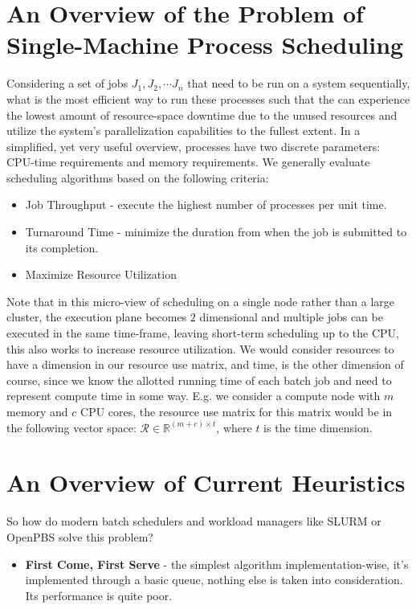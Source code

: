 \documentclass{article}
\begin{document}
\begin{spacing}{2.0}
\newpage
\section{An Overview of the Problem of Single-Machine Process Scheduling}

Considering a set of jobs $J_{1}, J_{2}, \cdots J_{n}$ that need to be run on a system sequentially, what is the most efficient way to run these processes such that the can experience the lowest amount of resource-space downtime due to the unused resources and utilize the system's parallelization capabilities to the fullest extent. In a simplified, yet very useful overview, processes have two discrete parameters: CPU-time requirements and memory requirements. We generally evaluate scheduling algorithms based on the following criteria:

\begin{itemize}
    \item Job Throughput - execute the highest number of processes per unit time.
    \item Turnaround Time - minimize the duration from when the job is submitted to its completion.
    \item Maximize Resource Utilization
\end{itemize}

Note that in this micro-view of scheduling on a single node rather than a large cluster, the execution plane becomes $2$ dimensional and multiple jobs
can be executed in the same time-frame, leaving short-term scheduling up to the CPU, this also works to increase resource utilization. We would consider
resources to have a dimension in our resource use matrix, and time, is the other dimension of course, since we know the allotted running time of each batch
job and need to represent compute time in some way. E.g. we consider a compute node with $m$ memory and $c$ CPU cores, the resource use matrix for this
matrix would be in the following vector space: $\mathcal{R} \in \mathbb{R}^{(m + c) \times t}$, where $t$ is the time dimension.

\newpage
\section{An Overview of Current Heuristics}

So how do modern batch schedulers and workload managers like SLURM or OpenPBS solve this problem?

\begin{itemize}
    \item \textbf{First Come, First Serve} - the simplest algorithm implementation-wise, it's implemented through a basic queue, nothing else is taken into consideration.
    Its performance is quite poor.


\end{itemize}
\end{spacing}
\end{document}

